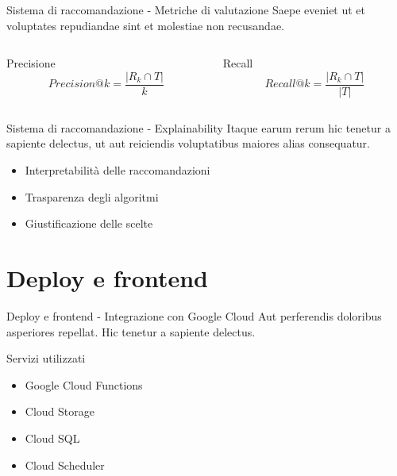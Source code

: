 \documentclass{beamer}
\begin{document}
	\begin{frame}{Sistema di raccomandazione - Metriche di valutazione}
		Saepe eveniet ut et voluptates repudiandae sint et molestiae non recusandae.

		\begin{columns}
			\begin{column}{0.5\textwidth}
				\begin{block}{Precisione}
					$$ Precision@k = \frac{|R_k \cap T|}{k} $$
				\end{block}
			\end{column}
			\begin{column}{0.5\textwidth}
				\begin{block}{Recall}
					$$ Recall@k = \frac{|R_k \cap T|}{|T|} $$
				\end{block}
			\end{column}
		\end{columns}
	\end{frame}

	\begin{frame}{Sistema di raccomandazione - Explainability}
		Itaque earum rerum hic tenetur a sapiente delectus, ut aut reiciendis voluptatibus maiores alias consequatur.

		\begin{itemize}
			\item Interpretabilità delle raccomandazioni
			\item Trasparenza degli algoritmi
			\item Giustificazione delle scelte
		\end{itemize}
	\end{frame}


	\section{Deploy e frontend}

	\begin{frame}{Deploy e frontend - Integrazione con Google Cloud}
		Aut perferendis doloribus asperiores repellat. Hic tenetur a sapiente delectus.

		\begin{block}{Servizi utilizzati}
			\begin{itemize}
				\item Google Cloud Functions
				\item Cloud Storage
				\item Cloud SQL
				\item Cloud Scheduler
			\end{itemize}
		\end{block}
	\end{frame}
\end{document}
